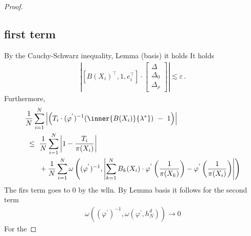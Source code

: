 \begin{proof}
\subsection*{first term}
By the Cauchy-Schwarz inequality, Lemma (basis) it holds
It holds
\begin{align*}
  \left|
   \left[ 
    B(X_i)^\top,1,e_i^\top
  \right]
  \cdot
  \begin{bmatrix}
    \Delta
    \\
    \Delta_0
    \\
    \Delta_\rho
    \end{bmatrix}
  \right|
  \lesssim
  \varepsilon
  \,.
\end{align*}
Furthermore,
\begin{align*}
  &
    \frac{1}{N}
\sum_{i=1} 
  ^N
  \left|
   \left( 
     T_i\cdot
  (
  \varphi^{'}
  )
  ^{-1}
  \!
  \left( 
\inner
{B(X_i)}
{
\lambda^*
}
  \right)
  \ 
  -
  \ 
  1
  \right)
  \right|
  \\
  &
  \ 
  \le
  \ 
    \frac{1}{N}
\sum_{i=1} 
^{N}
\left|
  1-
  \frac
  {T_i}
  {\pi(X_i)}
\right|
\\
&
\qquad
+
    \frac{1}{N}
    \sum_{i=1}^{N} 
\omega
\left(
  (
  \varphi^{'}
  )
  ^{-1}
  ,
  \left|
    \sum_{k=1}^{N}
  B_k(X_i)
  \cdot
  \varphi^{'}
  \left(
    \frac
    {1}
    {\pi(X_k)}
  \right)
  -
  \varphi^{'}
  \left(
    \frac
    {1}
    {\pi(X_i)}
  \right)
  \right|
  \right)
\end{align*}
The firs term goes to 0 by the wlln.
By Lemma basis it follows for the second term
\begin{align*}
\omega
\left(
  (
  \varphi^{'}
  )
  ^{-1}
  ,
  \omega(
  \varphi^{'}
  ,
  h_N^d
  )
  \right)
  \to 0
\end{align*}
For the 
 \end{proof}


